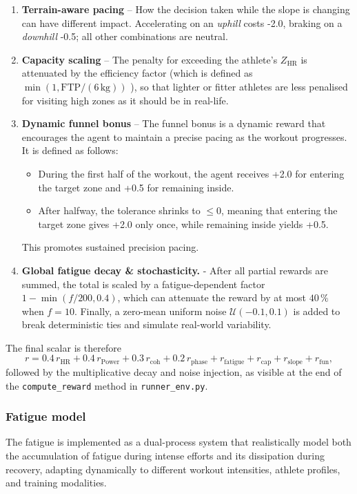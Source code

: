 \begin{enumerate}
  \item \textbf{Terrain-aware pacing} – How the decision taken while the slope is changing can have different impact. Accelerating on an
        \emph{uphill} costs -2.0, braking on a \emph{downhill} -0.5; all other combinations are neutral.

  \item \textbf{Capacity scaling} –  The penalty for exceeding the athlete's \(Z_{\text{HR}}\) is attenuated by the efficiency factor (which is defined as \(\min(1,\text{FTP}/(6\,\text{kg}))\) ), so that lighter or fitter athletes are less penalised for visiting high zones as it should be in real-life.
  
  \item \textbf{Dynamic funnel bonus} – The funnel bonus is a dynamic reward that encourages the agent to maintain a precise pacing as the workout progresses.  It is defined as follows:
        \begin{itemize}
          \item During the first half of the workout, the agent receives +2.0 for entering the target zone and +0.5 for remaining inside.
          \item After halfway, the tolerance shrinks to \(\le 0\), meaning that entering the target zone gives +2.0 only once, while remaining inside yields +0.5.
        \end{itemize}
        This promotes sustained precision pacing.

  \item \textbf{Global fatigue decay \& stochasticity.} -  After all partial rewards are summed, the total is scaled by a fatigue-dependent factor \(1-\min(f/200,0.4)\), which can attenuate the reward by at most \(40\,\%\) when \(f\!=\!10\).  
  Finally, a zero-mean uniform noise \(\mathcal{U}(-0.1,0.1)\) is added to break deterministic ties and simulate real-world variability. 

\end{enumerate}

The final scalar is therefore
\[
r = 0.4\,r_{\text{HR}} + 0.4\,r_{\text{Power}}
     + 0.3\,r_{\mathrm{coh}} + 0.2\,r_{\mathrm{phase}}
     + r_{\mathrm{fatigue}} + r_{\mathrm{cap}}
     + r_{\mathrm{slope}} + r_{\mathrm{fun}},
\]
followed by the multiplicative decay and noise injection, as visible at the end of the \texttt{compute\_reward} method in \texttt{runner\_env.py}.


\subsubsection{Fatigue model}\label{subsubsec:fatigue}
The fatigue is implemented as a dual-process system that realistically model both the accumulation of fatigue during intense efforts and its dissipation during recovery, adapting dynamically to different workout intensities, athlete profiles, and training modalities. 

